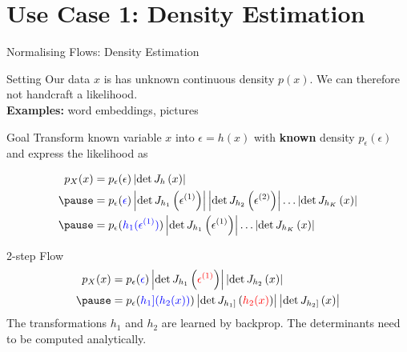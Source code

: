 \documentclass[14pt]{beamer}
\begin{document}
\section{Use Case 1: Density Estimation}
\begin{frame}
\tableofcontents[current]
\end{frame}

\begin{frame}{Normalising Flows: Density Estimation}
\begin{block}{Setting}
Our data $ x $ is has unknown continuous density $ p(x) $.
We can therefore not handcraft a likelihood.
\\ \pause
\textbf{Examples:} word embeddings, pictures
\end{block}
\pause
\begin{block}{Goal}
Transform known variable $ x $ into $ \epsilon = h(x) $ with \textbf{known} density $ p_{\epsilon}(\epsilon) $ and express the likelihood as
\begin{small}
\pause
\begin{equation*}
\begin{aligned}
p_{X}(x) &= p_{\epsilon}(\epsilon)\djac{h}{x} \\ \pause
&= p_{\epsilon}(\textcolor{blue}{\epsilon})\djac{h_{1}}{\epsilon^{(1)}}\djac{h_{2}}{\epsilon^{(2)}}\ldots \djac{h_{K}}{x} \\ \pause
&= p_{\epsilon}(\textcolor{blue}{h_{1}(\epsilon^{(1)})})\djac{h_{1}}{\epsilon^{(1)}}\ldots \djac{h_{K}}{x}
\end{aligned}
\end{equation*}
\end{small}
\end{block}
\end{frame}

\begin{frame}{2-step Flow}
\begin{equation*}
\begin{aligned}
p_{X}(x) &= p_{\epsilon}(\textcolor{blue}{\epsilon})\djac{h_{1}}{\textcolor{red}{\epsilon^{(1)}}}\djac{h_{2}}{x} \\ \pause
&= p_{\epsilon}(\textcolor{blue}{h_{1}](h_{2}(x))})\djac{h_{1}]}{\textcolor{red}{h_{2}(x)}}\djac{h_{2}]}{x}
\end{aligned}
\end{equation*}
\pause
The transformations $ h_{1} $ and $ h_{2} $ are learned by backprop. The determinants need to be computed analytically.
\end{frame}
\end{document}
